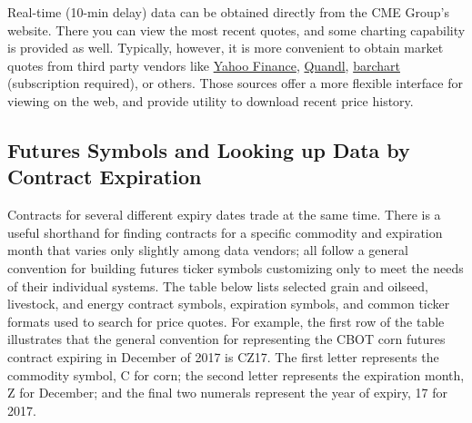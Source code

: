 \documentclass[]{book}
\theoremstyle{definition}
\theoremstyle{definition}
\theoremstyle{remark}
\begin{document}
Real-time (10-min delay) data can be obtained directly from the CME
Group's website. There you can view the most recent quotes, and some
charting capability is provided as well. Typically, however, it is more
convenient to obtain market quotes from third party vendors like
\href{http://finance.yahoo.com/}{Yahoo Finance},
\href{https://www.quandl.com/collections/futures}{Quandl},
\href{http://www.barchart.com/futures/marketoverview}{barchart}
(subscription required), or others. Those sources offer a more flexible
interface for viewing on the web, and provide utility to download recent
price history.

\subsection{Futures Symbols and Looking up Data by Contract
Expiration}\label{futures-symbols-and-looking-up-data-by-contract-expiration}

Contracts for several different expiry dates trade at the same time.
There is a useful shorthand for finding contracts for a specific
commodity and expiration month that varies only slightly among data
vendors; all follow a general convention for building futures ticker
symbols customizing only to meet the needs of their individual systems.
The table below lists selected grain and oilseed, livestock, and energy
contract symbols, expiration symbols, and common ticker formats used to
search for price quotes. For example, the first row of the table
illustrates that the general convention for representing the CBOT corn
futures contract expiring in December of 2017 is CZ17. The first letter
represents the commodity symbol, C for corn; the second letter
represents the expiration month, Z for December; and the final two
numerals represent the year of expiry, 17 for 2017.
\end{document}
